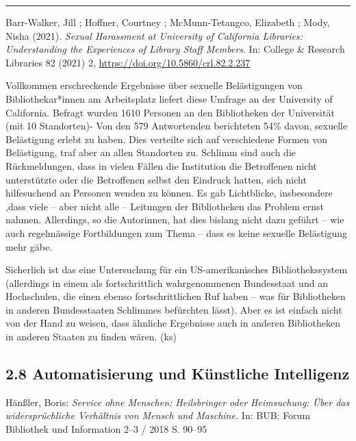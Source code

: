 \documentclass[a4paper,
fontsize=11pt,
oneside,
numbers=noperiodatend,
parskip=half-,
bibliography=totoc,
final
]{scrartcl}
\begin{document}
\begin{center}\rule{0.5\linewidth}{0.5pt}\end{center}

Barr-Walker, Jill ; Hoffner, Courtney ; McMunn-Tetangco, Elizabeth ;
Mody, Nisha (2021). \emph{Sexual Harassment at University of California
Libraries: Understanding the Experiences of Library Staff Members}. In:
College \& Research Libraries 82 (2021) 2,
\url{https://doi.org/10.5860/crl.82.2.237}

Vollkommen erschreckende Ergebnisse über sexuelle Belästigungen von
Bibliothekar*innen am Arbeitsplatz liefert diese Umfrage an der
University of California. Befragt wurden 1610 Personen an den
Bibliotheken der Universität (mit 10 Standorten)- Von den 579
Antwortenden berichteten 54\% davon, sexuelle Belästigung erlebt zu
haben. Dies verteilte sich auf verschiedene Formen von Belästigung, traf
aber an allen Standorten zu. Schlimm sind auch die Rückmeldungen, dass
in vielen Fällen die Institution die Betroffenen nicht unterstützte oder
die Betroffenen selbst den Eindruck hatten, sich nicht hilfesuchend an
Personen wenden zu können. Es gab Lichtblicke, insbesondere ,dass viele
-- aber nicht alle -- Leitungen der Bibliotheken das Problem ernst
nahmen. Allerdings, so die Autorinnen, hat dies bislang nicht dazu
geführt -- wie auch regelmässige Fortbildungen zum Thema -- dass es
keine sexuelle Belästigung mehr gäbe.

Sicherlich ist das eine Untersuchung für ein US-amerikanisches
Bibliothekssystem (allerdings in einem als fortschrittlich
wahrgenommenen Bundesstaat und an Hochschulen, die einen ebenso
fortschrittlichen Ruf haben -- was für Bibliotheken in anderen
Bundesstaaten Schlimmes befürchten lässt). Aber es ist einfach nicht von
der Hand zu weisen, dass ähnliche Ergebnisse auch in anderen
Bibliotheken in anderen Staaten zu finden wären. (ks)

\hypertarget{automatisierung-und-kuxfcnstliche-intelligenz}{%
\subsection{2.8 Automatisierung und Künstliche
Intelligenz}\label{automatisierung-und-kuxfcnstliche-intelligenz}}

Hänßler, Boris: \emph{Service ohne Menschen: Heilsbringer oder
Heimsuchung: Über das widersprüchliche Verhältnis von Mensch und
Maschine.} In: BUB: Forum Bibliothek und Information 2--3 / 2018 S.
90--95
\end{document}
